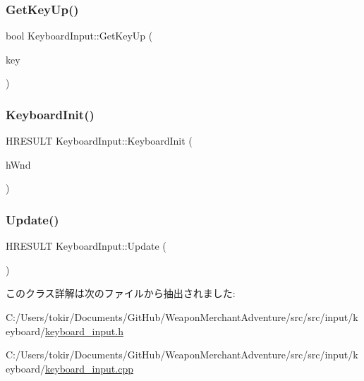 \subsubsection{\texorpdfstring{Get\+Key\+Up()}{GetKeyUp()}}
{\footnotesize\ttfamily bool Keyboard\+Input\+::\+Get\+Key\+Up (\begin{DoxyParamCaption}\item[{int}]{key }\end{DoxyParamCaption})}

\mbox{\label{class_keyboard_input_a89e4682682d489e35a73b641a497500c}} 
\subsubsection{\texorpdfstring{Keyboard\+Init()}{KeyboardInit()}}
{\footnotesize\ttfamily H\+R\+E\+S\+U\+LT Keyboard\+Input\+::\+Keyboard\+Init (\begin{DoxyParamCaption}\item[{H\+W\+ND}]{h\+Wnd }\end{DoxyParamCaption})}

\mbox{\label{class_keyboard_input_aa185427bfe9156eb21b12aebced6ba81}} 
\subsubsection{\texorpdfstring{Update()}{Update()}}
{\footnotesize\ttfamily H\+R\+E\+S\+U\+LT Keyboard\+Input\+::\+Update (\begin{DoxyParamCaption}{ }\end{DoxyParamCaption})}



このクラス詳解は次のファイルから抽出されました\+:\begin{DoxyCompactItemize}
\item 
C\+:/\+Users/tokir/\+Documents/\+Git\+Hub/\+Weapon\+Merchant\+Adventure/src/src/input/keyboard/\mbox{\hyperlink{keyboard__input_8h}{keyboard\+\_\+input.\+h}}\item 
C\+:/\+Users/tokir/\+Documents/\+Git\+Hub/\+Weapon\+Merchant\+Adventure/src/src/input/keyboard/\mbox{\hyperlink{keyboard__input_8cpp}{keyboard\+\_\+input.\+cpp}}\end{DoxyCompactItemize}
